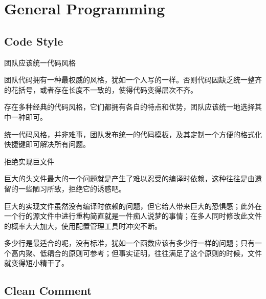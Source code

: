 \begin{savequote}[45mm]
\end{savequote}

\chapter{General Programming}
\label{ch:general-programming}

\section{Code Style}

\begin{content}

\begin{regulation}
团队应该统一代码风格
\end{regulation}

团队代码拥有一种最权威的风格，犹如一个人写的一样。否则代码因缺乏统一整齐的花括号，或者存在长度不一致的，使得代码变得层次不齐。

存在多种经典的代码风格，它们都拥有各自的特点和优势，团队应该统一地选择其中一种即可。
\begin{enum}
\end{enum}

统一代码风格，并非难事，团队发布统一的代码模板，及其定制一个方便的格式化快捷键即可解决所有问题。

\begin{regulation}
拒绝实现巨文件
\end{regulation}

巨大的头文件最大的一个问题就是产生了难以忍受的编译时依赖，这种往往是由遗留的一些陋习所致，拒绝它的诱惑吧。

巨大的实现文件虽然没有编译时依赖的问题，但它给人带来巨大的恐惧感；此外在一个行的源文件中进行重构简直就是一件痴人说梦的事情；在多人同时修改此文件的概率大大加大，使用配置管理工具时冲突不断。

多少行是最适合的呢，没有标准，犹如一个函数应该有多少行一样的问题；只有一个高内聚、低耦合的原则可参考；但事实证明，往往满足了这个原则的时候，文件就变得短小精干了。

\end{content}


\section{Clean Comment}

